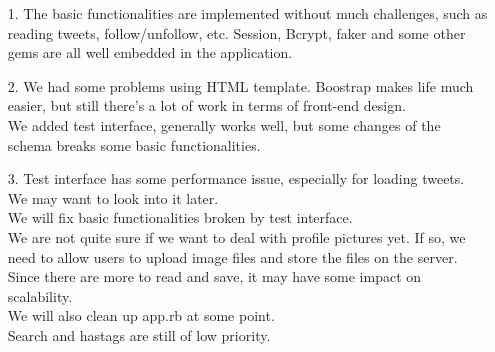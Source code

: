 \documentclass[]{article}
\begin{document}
\begin{enumerate}
	\item[1.]
	The basic functionalities are implemented without much challenges, such as reading tweets, follow/unfollow, etc. Session, Bcrypt, faker and some other gems are all well embedded in the application. 
	\item[2.]
	We had some problems using HTML template. Boostrap makes life much easier, but still there's a lot of work in terms of front-end design. \\
	We added test interface, generally works well, but some changes of the schema breaks some basic functionalities. 
	\item[3.]
	Test interface has some performance issue, especially for loading tweets. We may want to look into it later. \\
	We will fix basic functionalities broken by test interface. \\
	We are not quite sure if we want to deal with profile pictures yet. If so, we need to allow users to upload image files and store the files on the server. Since there are more to read and save, it may have some impact on scalability. \\
	We will also clean up app.rb at some point. \\
	Search and hastags are still of low priority. 
\end{enumerate}
\end{document}
